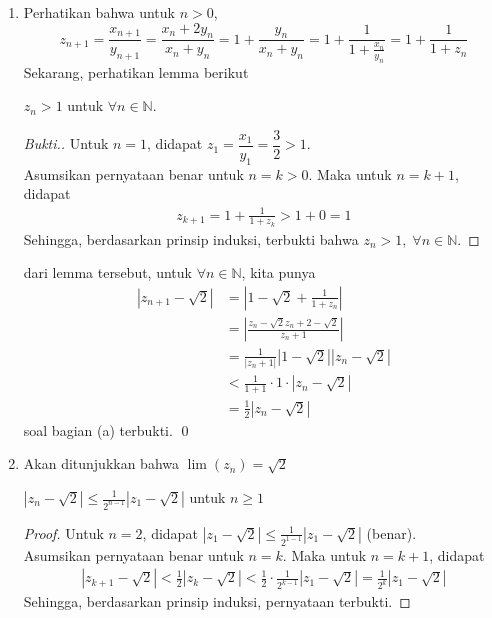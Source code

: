	\begin{enumerate}
		\item[a.] Perhatikan bahwa untuk $n>0$,
		$$
		z_{n+1} = \frac{x_{n+1}}{y_{n+1}} 
		= \frac{x_n +  2y_n}{x_n+y_n} 
		= 1 + \frac{y_n}{x_n+y_n} 
		= 1 + \frac{1}{1+\frac{x_n}{y_n}} 
		= 1 + \frac{1}{1 + z_n}$$
		Sekarang, perhatikan lemma berikut
		 
		 \begin{lemma} $z_n > 1$ untuk $\forall n \in \mathbb{N}$.
		 		
		 		\begin{proof}[Bukti.]
		 			Untuk $n=1$, didapat $z_1 = \dfrac{x_1}{y_1} = \dfrac{3}{2} > 1$.\\
		 			Asumsikan pernyataan benar untuk $n=k > 0$. Maka untuk $n = k+1$, didapat 
		 			\begin{align*}
		 				z_{k+1}
		 				= 1 + \frac{1}{1 + z_k}
		 				> 1 + 0 = 1
		 			\end{align*}
		 			Sehingga, berdasarkan prinsip induksi, terbukti bahwa $z_n > 1, \; \forall n \in \mathbb{N}$.
		 		\end{proof}
		 		
		 	\end{lemma}
		 
		
		dari lemma tersebut, untuk $\forall n \in \mathbb{N}$, kita punya
		\begin{align*}
			\left|z_{n+1} - \sqrt{2}\right| 
			&= \left|1 - \sqrt{2} + \frac{1}{1+z_n}\right|  \\
			&= \left|\frac{z_n-\sqrt{2}z_n+2-\sqrt{2}}{z_n+1}\right| \\
			&= \frac{1}{\left|z_n+1\right|}\left|1-\sqrt{2}\right|\left|z_n-\sqrt{2}\right| \\
			&< \frac{1}{1+1}\cdot1\cdot\left|z_n-\sqrt{2}\right| \\
			&= \frac12\left|z_n-\sqrt{2}\right|
		\end{align*}
	soal bagian (a) terbukti. \qed
	\newpage
	\item[b.] Akan ditunjukkan bahwa $\lim (z_n) = \sqrt{2}$
	\begin{lemma}
		$\left|z_{n} - \sqrt{2}\right| \le \frac{1}{2^{n-1}}\left|z_1-\sqrt{2}\right|$ untuk $n \ge 1$
		\begin{proof}
			Untuk $n=2$, didapat $\left|z_{1} - \sqrt{2}\right|
			\le \frac{1}{2^{1-1}}\left|z_1-\sqrt{2}\right|$ (benar).\\
			Asumsikan pernyataan benar untuk $n=k$. Maka untuk $n = k+1$, didapat 
			\begin{align*}
				\left|z_{k+1} - \sqrt{2}\right|
				< \frac12\left|z_k-\sqrt{2}\right| <\frac12 \cdot \frac{1}{2^{k-1}}\left|z_1-\sqrt{2}\right| = \frac{1}{2^{k}}\left|z_1-\sqrt{2}\right|
			\end{align*}
			Sehingga, berdasarkan prinsip induksi, pernyataan terbukti.
		\end{proof}
	\end{lemma}
	

\end{enumerate}
